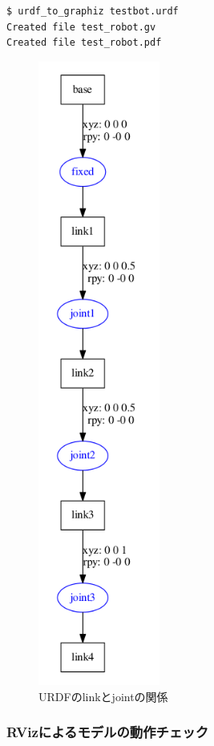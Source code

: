 \begin{lstlisting}[language=ROS]
$ urdf_to_graphiz testbot.urdf
Created file test_robot.gv
Created file test_robot.pdf
\end{lstlisting}

\begin{figure}[htp]
  \centering
  \includegraphics[width=4cm]{pictures/chapter11/pic_11_05.png}
  \caption{URDFのlinkとjointの関係}
\end{figure}

\subsubsection{RVizによるモデルの動作チェック}

